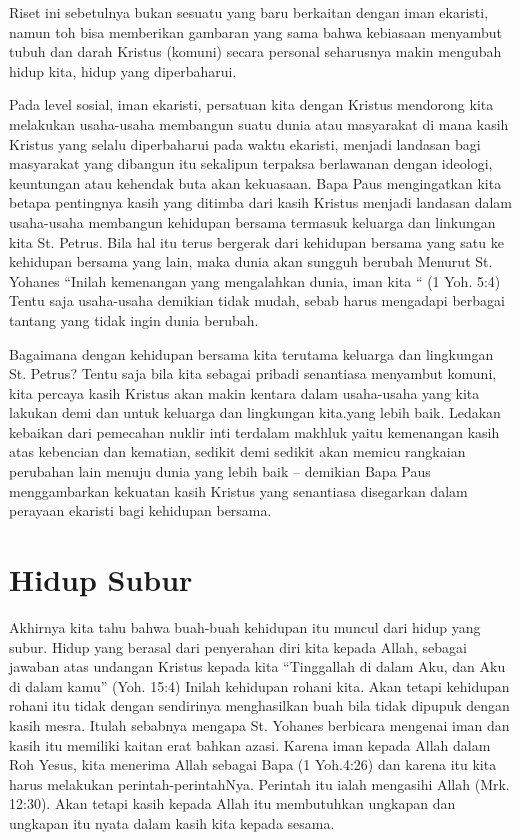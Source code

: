 Riset ini sebetulnya bukan sesuatu yang baru berkaitan dengan iman ekaristi, namun toh bisa memberikan gambaran yang sama bahwa kebiasaan menyambut tubuh dan darah Kristus (komuni) secara personal seharusnya makin mengubah hidup kita, hidup yang diperbaharui.

       Pada level sosial, iman ekaristi, persatuan kita dengan Kristus mendorong kita melakukan usaha-usaha membangun suatu dunia atau masyarakat di mana kasih Kristus yang selalu diperbaharui pada waktu ekaristi,  menjadi landasan bagi masyarakat yang dibangun itu sekalipun  terpaksa berlawanan dengan ideologi, keuntungan atau kehendak buta akan kekuasaan. Bapa Paus mengingatkan kita betapa pentingnya kasih yang ditimba dari kasih Kristus menjadi landasan dalam usaha-usaha membangun kehidupan bersama termasuk keluarga dan linkungan kita St. Petrus.  Bila hal itu terus bergerak dari kehidupan bersama yang satu ke kehidupan bersama yang lain, maka dunia akan sungguh berubah  Menurut St. Yohanes ``Inilah kemenangan yang mengalahkan dunia, iman kita `` (1 Yoh. 5:4) Tentu saja usaha-usaha demikian tidak mudah, sebab harus mengadapi berbagai tantang yang tidak ingin dunia berubah.

       Bagaimana dengan kehidupan bersama kita terutama keluarga dan lingkungan St. Petrus? Tentu saja bila kita sebagai pribadi senantiasa menyambut komuni, kita percaya  kasih Kristus akan makin kentara dalam usaha-usaha yang kita lakukan demi dan untuk keluarga dan lingkungan kita.yang lebih baik. Ledakan kebaikan dari pemecahan nuklir inti terdalam makhluk yaitu kemenangan kasih atas kebencian dan kematian, sedikit demi sedikit akan memicu rangkaian perubahan lain  menuju dunia yang lebih baik – demikian Bapa Paus menggambarkan kekuatan kasih Kristus yang senantiasa disegarkan dalam perayaan ekaristi bagi kehidupan bersama.

\section*{Hidup Subur}
      Akhirnya kita tahu bahwa buah-buah kehidupan itu muncul dari hidup yang subur. Hidup yang berasal dari penyerahan diri kita kepada Allah, sebagai jawaban atas undangan Kristus kepada kita ``Tinggallah di dalam Aku, dan Aku di dalam kamu'' (Yoh. 15:4) Inilah kehidupan rohani kita. Akan tetapi kehidupan rohani itu tidak dengan sendirinya menghasilkan buah bila tidak dipupuk dengan kasih mesra. Itulah sebabnya mengapa St. Yohanes berbicara mengenai iman dan kasih itu memiliki kaitan erat bahkan azasi. Karena iman kepada Allah dalam Roh Yesus, kita menerima Allah sebagai Bapa (1 Yoh.4:26) dan karena itu kita harus melakukan perintah-perintahNya. Perintah itu ialah mengasihi Allah (Mrk. 12:30). Akan tetapi kasih kepada Allah itu membutuhkan ungkapan dan ungkapan itu nyata dalam kasih kita kepada sesama.

